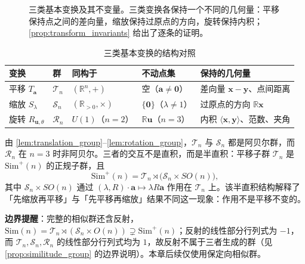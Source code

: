 \begin{figure}[htbp]
    \caption{三类基本变换及其不变量。三类变换各保持一个不同的几何量：平移保持点之间的差向量，缩放保持过原点的方向，旋转保持内积；\cref{prop:transform_invariants} 给出了逐条的证明。}
    \label{fig:three_basic_transforms}
\end{figure}

\begin{table}[htbp]
    \centering
    \caption{三类基本变换的结构对照}
    \label{tab:transform_summary}
    \renewcommand{\arraystretch}{1.35}
    \begin{tabularx}{\textwidth}{@{}l l l l X@{}}
        \toprule
        \textbf{变换} & \textbf{群} & \textbf{同构于} & \textbf{不动点集} & \textbf{保持的几何量} \\
        \midrule
        平移 $T_{\mathbf a}$ & $\mathcal T_n$ & $(\mathbb R^n,+)$ & 空（$\mathbf a\ne\mathbf 0$） & 差向量 $\mathbf x-\mathbf y$、点间距离 \\
        缩放 $S_\lambda$ & $\mathcal S_n$ & $(\mathbb R_{>0},\times)$ & $\{\mathbf 0\}$（$\lambda\ne1$） & 过原点的方向 $\mathbb R\mathbf x$ \\
        旋转 $R_{\mathbf u,\theta}$ & $\mathcal R_n$ & $U(1)$（$n=2$） & $\mathbb R\mathbf u$（$n=3$） & 内积 $\langle\mathbf x,\mathbf y\rangle$、范数、夹角 \\
        \bottomrule
    \end{tabularx}
\end{table}

\begin{remark}[三者的群表示论关系]\label{rem:transform_group_relations}
由 \cref{lem:translation_group}--\cref{lem:rotation_group}，$\mathcal T_n$ 与 $\mathcal S_n$ 都是阿贝尔群，而 $\mathcal R_n$ 在 $n=3$ 时非阿贝尔。三者的交互不是直积，而是半直积：平移子群 $\mathcal T_n$ 是 $\mathrm{Sim}^{+}(n)$ 的正规子群，且
\[
\mathrm{Sim}^{+}(n) = \mathcal T_n \rtimes \bigl(\mathcal S_n \times SO(n)\bigr),
\]
其中 $\mathcal S_n\times SO(n)$ 通过 $(\lambda,R)\cdot\mathbf a \mapsto \lambda R\mathbf a$ 作用在 $\mathcal T_n$ 上。该半直积结构解释了「先缩放再平移」与「先平移再缩放」结果不同这一现象：作用不是平移不变的。

\textbf{边界提醒}：完整的相似群还含反射，$\mathrm{Sim}(n)=\mathcal T_n\rtimes(\mathcal S_n\times O(n))\supsetneq\mathrm{Sim}^{+}(n)$；反射的线性部分行列式为 $-1$，而 $\mathcal T_n,\mathcal S_n,\mathcal R_n$ 的线性部分行列式均为 $1$，故反射不属于三者生成的群（见 \cref{prop:similitude_group} 的边界说明）。本章后续仅使用保定向相似群。
\end{remark}


